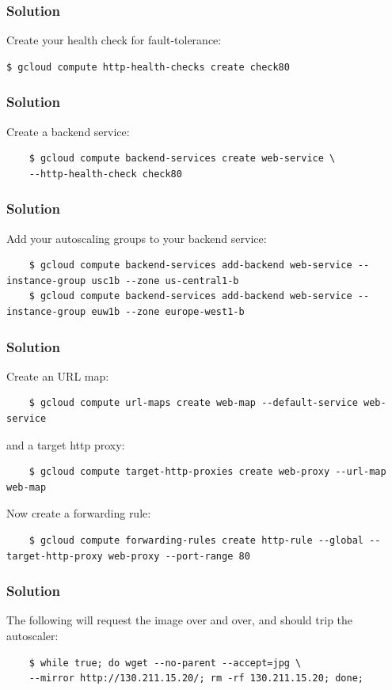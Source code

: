 \documentclass[9pt]{beamer}
\begin{document}
\begin{frame}[fragile]
  \frametitle{Solution}
  Create your health check for fault-tolerance:
  \begin{verbatim}
$ gcloud compute http-health-checks create check80
  \end{verbatim}
\end{frame}

\begin{frame}[fragile]
  \frametitle{Solution}
  Create a backend service:
  \begin{verbatim}
    $ gcloud compute backend-services create web-service \
    --http-health-check check80
  \end{verbatim}
\end{frame}

\begin{frame}[fragile]
  \frametitle{Solution}
  Add your autoscaling groups to your backend service:
  \begin{verbatim}
    $ gcloud compute backend-services add-backend web-service --instance-group usc1b --zone us-central1-b
    $ gcloud compute backend-services add-backend web-service --instance-group euw1b --zone europe-west1-b
  \end{verbatim}
\end{frame}

\begin{frame}[fragile]
  \frametitle{Solution}
  Create an URL map:
  \begin{verbatim}
    $ gcloud compute url-maps create web-map --default-service web-service
  \end{verbatim}
  and a target http proxy:
  \begin{verbatim}
    $ gcloud compute target-http-proxies create web-proxy --url-map web-map
  \end{verbatim}
\end{frame}

\begin{frame}[fragile]
  Now create a forwarding rule:
  \begin{verbatim}
    $ gcloud compute forwarding-rules create http-rule --global --target-http-proxy web-proxy --port-range 80
  \end{verbatim}
\end{frame}

\begin{frame}[fragile]
  \frametitle{Solution}
  The following will request the image over and over, and should trip the autoscaler:
  \begin{verbatim}
    $ while true; do wget --no-parent --accept=jpg \
    --mirror http://130.211.15.20/; rm -rf 130.211.15.20; done;
  \end{verbatim}
\end{frame}
\end{document}
